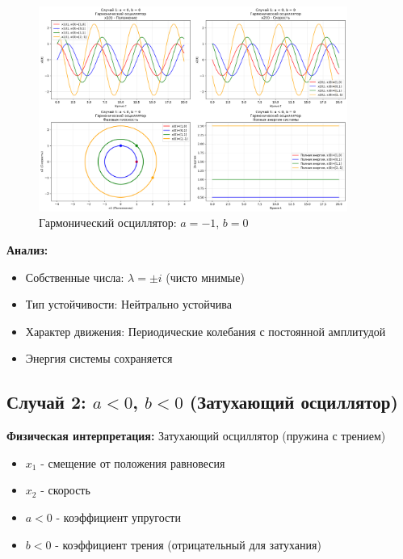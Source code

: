 \begin{figure}[H]
    \centering
    \includegraphics[width=0.9\textwidth]{images/task3/oscillator_case1_harmonic.png}
    \caption{Гармонический осциллятор: $a = -1$, $b = 0$}
\end{figure}

\textbf{Анализ:}
\begin{itemize}
    \item Собственные числа: $\lambda = \pm i$ (чисто мнимые)
    \item Тип устойчивости: Нейтрально устойчива
    \item Характер движения: Периодические колебания с постоянной амплитудой
    \item Энергия системы сохраняется
\end{itemize}

\subsection*{Случай 2: $a < 0$, $b < 0$ (Затухающий осциллятор)}

\textbf{Физическая интерпретация:} Затухающий осциллятор (пружина с трением)

\begin{itemize}
    \item $x_1$ - смещение от положения равновесия
    \item $x_2$ - скорость
    \item $a < 0$ - коэффициент упругости
    \item $b < 0$ - коэффициент трения (отрицательный для затухания)
\end{itemize}

